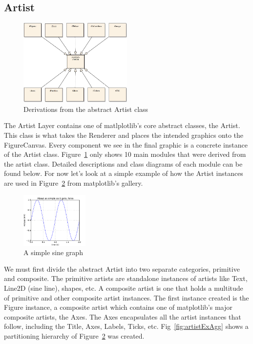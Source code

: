 \documentclass[pdftex,10pt,a4paper]{report}
\begin{document}
\subsection{Artist}
\begin{figure}[ht!]
        \centering
                \includegraphics[width=0.5\textwidth]{img/umls/arch/absArtist}
        \caption{Derivations from the abstract Artist class}\label{fig:absArtist}
\end{figure}
The Artist Layer contains one of matlplotlib's core abstract classes, the Artist. This class is what takes the Renderer and places the intended graphics onto the FigureCanvas. Every component we see in the final graphic is a concrete instance of the Artist class. Figure~\ref{fig:absArtist} only shows 10 main modules that were derived from the artist class. Detailed descriptions and class diagrams of each module can be found below. For now let's look at a simple example of how the Artist instances are used in Figure~\ref{fig:artistEx} from matplotlib's gallery.

\begin{figure}[ht!]
        \centering
                \includegraphics[width=0.3\textwidth]{img/examples/simple_plot}
        \caption{A simple sine graph}\label{fig:artistEx}
\end{figure}

We must first divide the abstract Artist into two separate categories, primitive and composite. The primitive artists are standalone instances of artists like Text, Line2D (sine line), shapes, etc. A composite artist is one that holds a multitude of primitive and other composite artist instances. The first instance created is the Figure instance, a composite artist which contains one of matplotlib's major composite artists, the Axes. The Axes encapsulates all the artist instances that follow, including the Title, Axes, Labels, Ticks, etc. Fig~\ref{fig:artistExAgg} shows a partitioning hierarchy of Figure~\ref{fig:artistEx} was created.
\end{document}
